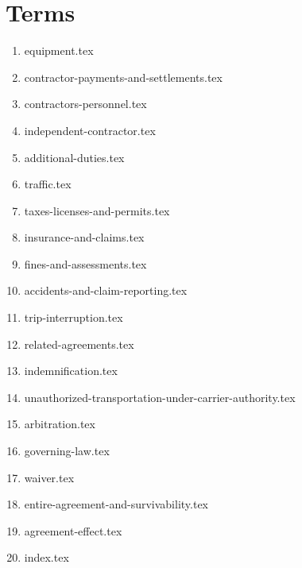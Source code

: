 \section{Terms}
\begin{enumerate}
    \item {equipment.tex}
    \item {contractor-payments-and-settlements.tex}
    \item {contractors-personnel.tex}
    \item {independent-contractor.tex}
    \item {additional-duties.tex}
    \item {traffic.tex}
    \item {taxes-licenses-and-permits.tex}
    \item {insurance-and-claims.tex}
    \item {fines-and-assessments.tex}
    \item {accidents-and-claim-reporting.tex}
    \item {trip-interruption.tex}
    \item {related-agreements.tex}
    \item {indemnification.tex}
    \item {unauthorized-transportation-under-carrier-authority.tex}
    \item {arbitration.tex}
    \item {governing-law.tex}
    \item {waiver.tex}
    \item {entire-agreement-and-survivability.tex}
    \item {agreement-effect.tex}
    \item {index.tex}
\end{enumerate}